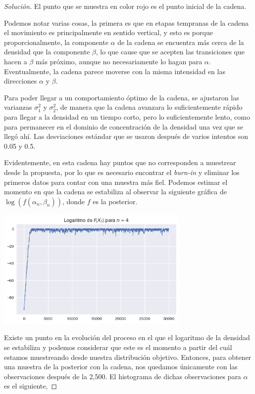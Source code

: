 \documentclass{article}
\begin{document}
\begin{enumerate}
\begin{proof}[Solución]
        El punto que se muestra en color rojo es el punto inicial de la cadena. 
        
        Podemos notar varias cosas, la primera es que en etapas tempranas de la cadena el
        movimiento es principalmente en sentido vertical, y esto es porque proporcionalmente,
        la componente $\alpha$ de la cadena se encuentra más cerca de la densidad que la componente
        $\beta$, lo que cause que se acepten las transiciones que hacen a $\beta$ más próximo,
        aunque no necesariamente lo hagan para $\alpha$. Eventualmente, la cadena parece moverse 
        con la misma intensidad en las direcciones $\alpha$ y $\beta$. 

        Para poder llegar a un comportamiento óptimo de la cadena, se ajustaron las varianzas
        $\sigma_1^2$ y $\sigma_2^2$, de manera que la cadena avanzara lo suficientemente rápido
        para llegar a la densidad en un tiempo corto, pero lo suficientemente lento, como para 
        permanecer en el dominio de concentración de la densidad una vez que se llegó ahí. Las
        desviaciones estándar que se usaron después de varios intentos son 0.05 y 0.5.

        Evidentemente, en esta cadena hay puntos que no corresponden a muestrear desde la 
        propuesta, por lo que es necesario encontrar el \textit{burn-in} y eliminar los primeros
        datos para contar con una muestra más fiel. Podemos estimar el momento en que la cadena 
        se estabiliza al observar la siguiente gráfica de $\log(f(\alpha_n,\beta_n))$, donde
        $f$ es la posterior.

        \begin{center}
            \includegraphics[width=0.7\textwidth]{tarea7/logdensgamma4.png}
        \end{center}

        Existe un punto en la evolución del proceso en el que el logaritmo de la densidad se estabiliza
        y podemos considerar que este es el momento a partir del cuál estamos muestreando desde 
        nuestra distribución objetivo. Entonces, para obtener una muestra de la posterior con la
        cadena, nos quedamos únicamente con las observaciones después de la 2,500. El histograma
        de dichas observaciones para $\alpha$ es el siguiente,


\end{proof}
\end{enumerate}
\end{document}
